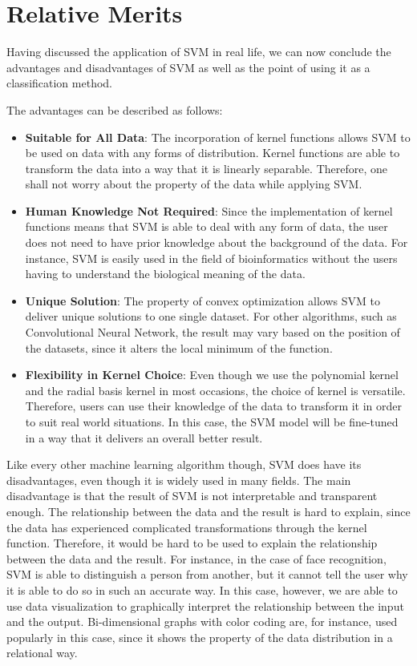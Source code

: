 \section{Relative Merits}
Having discussed the application of SVM in real life, we can now conclude
the advantages and disadvantages of SVM as well as the point of using it 
as a classification method. 

The advantages can be described as follows:
\begin{itemize}
    \item \textbf{Suitable for All Data}: The incorporation of kernel functions
    allows SVM to be used on data with any forms of distribution. Kernel functions
    are able to transform the data into a way that it is linearly separable. Therefore,
    one shall not worry about the property of the data while applying SVM.
    \item \textbf{Human Knowledge Not Required}: Since the implementation of kernel functions
    means that SVM is able to deal with any form of data, the user does not need to 
    have prior knowledge about the background of the data. For instance, SVM is easily
    used in the field of bioinformatics without the users having to understand the 
    biological meaning of the data.
    \item \textbf{Unique Solution}: The property of convex optimization allows SVM
    to deliver unique solutions to one single dataset. For other algorithms, 
    such as Convolutional Neural Network, the result may vary based on the position of
    the datasets, since it alters the local minimum of the function.
    \item \textbf{Flexibility in Kernel Choice}: Even though we use the polynomial
    kernel and the radial basis kernel in most occasions, the choice of kernel is
    versatile. Therefore, users can use their knowledge of the data to transform it
    in order to suit real world situations. In this
    case, the SVM model will be fine-tuned in a way that it delivers an overall better
    result.
\end{itemize}

Like every other machine learning algorithm though,
SVM does have its disadvantages, even though it is widely used in many
fields. The main disadvantage is that the result of SVM is not 
interpretable and transparent enough. The relationship between the data
and the result is hard to explain, since the data has experienced 
complicated transformations through the kernel function.
Therefore, it would be hard to be used to explain
the relationship between the data and the result. For instance,
in the case of face recognition, SVM is able to distinguish
a person from another, but it cannot tell the user why it is
able to do so in such an accurate way. In this case, however, 
we are able to use data visualization to graphically interpret the relationship
between the input and the output. Bi-dimensional graphs with color coding are, 
for instance, used popularly in this case, since it shows the property of
the data distribution in a relational way. 
\cite{procon}
